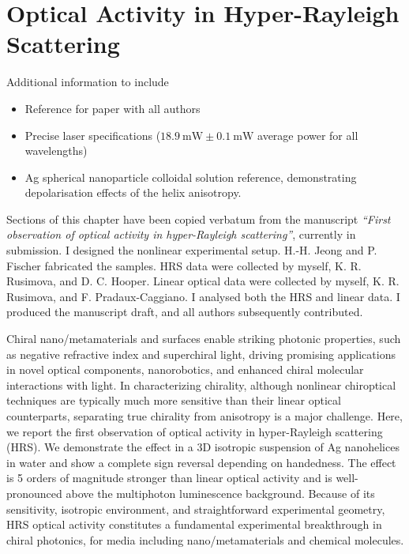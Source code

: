 \chapter{Optical Activity in Hyper-Rayleigh Scattering}\label{sec:results:HRS}

\color{red}
Additional information to include
\begin{itemize}
    \item Reference for paper with all authors
    \item Precise laser specifications ($\SI{18.9}{\milli\watt}\pm\SI{0.1}{\milli\watt}$ average power for all wavelengths)
    \item Ag spherical nanoparticle colloidal solution reference, demonstrating depolarisation effects of the helix anisotropy.
\end{itemize}
\color{black}

Sections of this chapter have been copied verbatum from the manuscript \textit{``First observation of optical activity in hyper-Rayleigh scattering''}, currently in submission.
I designed the nonlinear experimental setup. H.-H. Jeong and P. Fischer fabricated the samples. HRS data were collected by myself, K. R. Rusimova, and D. C. Hooper. Linear optical data were collected by myself, K. R. Rusimova, and F. Pradaux-Caggiano. I analysed both the HRS and linear data. I produced the manuscript draft, and all authors subsequently contributed.

\bigskip \noindent
Chiral nano/metamaterials and surfaces enable striking photonic properties, such as negative refractive index and superchiral light, driving promising applications in novel optical components, nanorobotics, and enhanced chiral molecular interactions with light. In characterizing chirality, although nonlinear chiroptical techniques are typically much more sensitive than their linear optical counterparts, separating true chirality from anisotropy is a major challenge. Here, we report the first observation of optical activity in hyper-Rayleigh scattering (HRS). We demonstrate the effect in a 3D isotropic suspension of Ag nanohelices in water and show a complete sign reversal depending on handedness. The effect is 5 orders of magnitude stronger than linear optical activity and is well-pronounced above the multiphoton luminescence background. Because of its sensitivity, isotropic environment, and straightforward experimental geometry, HRS optical activity constitutes a fundamental experimental breakthrough in chiral photonics, for media including nano/metamaterials and chemical molecules. 


